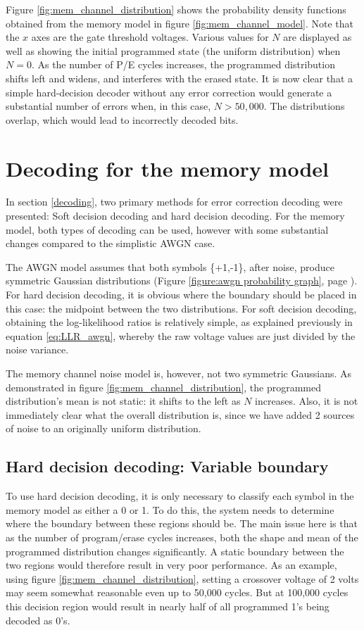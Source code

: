 \documentclass[11pt]{article}
\numberwithin{equation}{subsection}
\begin{document}
Figure \ref{fig:mem_channel_distribution} shows the probability density functions obtained from the memory model in figure \ref{fig:mem_channel_model}. Note that the $x$ axes are the gate threshold voltages. Various values for $N$ are displayed as well as showing the initial programmed state (the uniform distribution) when $N=0$. As the number of P/E cycles increases, the programmed distribution shifts left and widens, and interferes with the erased state. It is now clear that a simple hard-decision decoder without any error correction would generate a substantial number of errors when, in this case, $N > 50,000$. The distributions overlap, which would lead to incorrectly decoded bits.

\section{Decoding for the memory model} \label{section:memoryDecoding}

In section \ref{decoding}, two primary methods for error correction decoding were presented: Soft decision decoding and hard decision decoding. For the memory model, both types of decoding can be used, however with some substantial changes compared to the simplistic AWGN case.

The AWGN model assumes that both symbols \{+1,-1\}, after noise, produce symmetric Gaussian distributions (Figure \ref{figure:awgn probability graph}, page \pageref{figure:awgn probability graph}). For hard decision decoding, it is obvious where the boundary should be placed in this case: the midpoint between the two distributions. For soft decision decoding, obtaining the log-likelihood ratios is relatively simple, as explained previously in equation \ref{eq:LLR_awgn}, whereby the raw voltage values are just divided by the noise variance. 

The memory channel noise model is, however, not two symmetric Gaussians. As demonstrated in figure \ref{fig:mem_channel_distribution}, the programmed distribution's mean is not static: it shifts to the left as $N$ increases. Also, it is not immediately clear what the overall distribution is, since we have added 2 sources of noise to an originally uniform distribution.

\subsection{Hard decision decoding: Variable boundary}

To use hard decision decoding, it is only necessary to classify each symbol in the memory model as either a 0 or 1. To do this, the system needs to determine where the boundary between these regions should be. The main issue here is that as the number of program/erase cycles increases, both the shape and mean of the programmed distribution changes significantly. A static boundary between the two regions would therefore result in very poor performance. As an example, using figure \ref{fig:mem_channel_distribution}, setting a crossover voltage of 2 volts may seem somewhat reasonable even up to 50,000 cycles. But at 100,000 cycles this decision region would result in nearly half of all programmed 1's being decoded as 0's.
\end{document}
